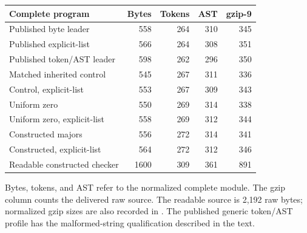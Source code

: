 \begin{center}\small
\begin{tabular}{lrrrr}
\toprule
Complete program & Bytes & Tokens & AST & gzip-9\\
\midrule
Published byte leader & 558 & 264 & 310 & 345\\
Published explicit-list & 566 & 264 & 308 & 351\\
Published token/AST leader & 598 & 262 & 296 & 350\\
\midrule
Matched inherited control & 545 & 267 & 311 & 336\\
Control, explicit-list & 553 & 267 & 309 & 343\\
Uniform zero & 550 & 269 & 314 & 338\\
Uniform zero, explicit-list & 558 & 269 & 312 & 344\\
Constructed majors & 556 & 272 & 314 & 341\\
Constructed, explicit-list & 564 & 272 & 312 & 346\\
Readable constructed checker & 1600 & 309 & 361 & 891\\
\bottomrule
\end{tabular}
\end{center}
Bytes, tokens, and AST refer to the normalized complete module. The gzip column counts the delivered raw source. The readable source is 2,192 raw bytes; normalized gzip sizes are also recorded in . The published generic token/AST profile has the malformed-string qualification described in the text.
